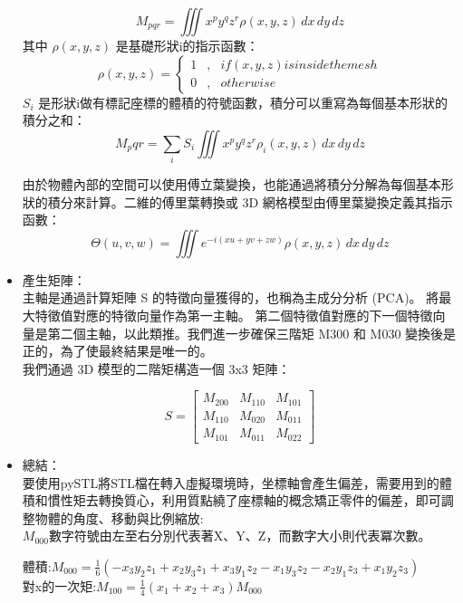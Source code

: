 \begin{itemize}
$$M_{pqr} = \iiint x^{p} y^{q} z^{r} \rho (x,y,z) \,dx\,dy\,dz$$
其中 $\rho (x,y,z)$ 是基礎形狀i的指示函數：\\
\begin{equation}
\label{eq6}
\rho (x,y,z) = \left\{
\begin{aligned}
1 & , & if (x,y,z) is inside the mesh\\
0 & , &              otherwise
\end{aligned}
\right.
\end{equation}
$S_i$ 是形狀i做有標記座標的體積的符號函數，積分可以重寫為每個基本形狀的積分之和：\\
$$M_pqr = \sum_{i} S_i \iiint x^{p} y^{q} z^{r} \rho_i (x,y,z) \,dx\,dy\,dz$$

由於物體內部的空間可以使用傅立葉變換，也能通過將積分分解為每個基本形狀的積分來計算。二維的傅里葉轉換或 3D 網格模型由傅里葉變換定義其指示函數：\\

$$ \Theta (u,v,w) = \iiint e^{-i (xu+yv+zw)} \rho (x,y,z) \,dx\,dy\,dz $$

\item 產生矩陣：\\
主軸是通過計算矩陣 S 的特徵向量獲得的，也稱為主成分分析 (PCA)。 將最大特徵值對應的特徵向量作為第一主軸。 第二個特徵值對應的下一個特徵向量是第二個主軸，以此類推。我們進一步確保三階矩 M300 和 M030 變換後是正的，為了使最終結果是唯一的。\\

我們通過 3D 模型的二階矩構造一個 3x3 矩陣：

\[ 
S=\begin{bmatrix} 
M_{200} & M_{110} & M_{101} \\
M_{110} & M_{020} & M_{011} \\
M_{101} & M_{011} & M_{022} 
\end{bmatrix}
\]

\item 總結：\\
要使用pySTL將STL檔在轉入虛擬環境時，坐標軸會產生偏差，需要用到的體積和慣性矩去轉換質心，利用質點繞了座標軸的概念矯正零件的偏差，即可調整物體的角度、移動與比例縮放:\\

$M_{000}$數字符號由左至右分別代表著X、Y、Z，而數字大小則代表冪次數。


體積:$M_{000} = \frac{1}{6}(-x_3 y_2 z_1 + x_2 y_3 z_1 + x_3 y_1 z_2 - x_1 y_3 z_2 - x_2 y_1 z_3 + x_1 y_2 z_3) $\\

對x的一次矩:$M_{100} = \frac{1}{4}(x_1 + x_2 + x_3) M_{000} $\\


\end{itemize}
